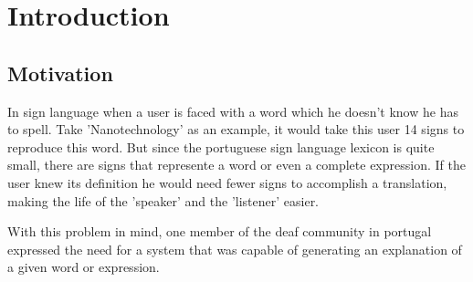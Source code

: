 % 
\chapter{Introduction} %
\label{chap:Chapter1} %

\section{Motivation}

In sign language when a user is faced with a word which he doesn't know he has to spell.
Take 'Nanotechnology' as an example, it would take this user 14 signs to reproduce this word.
But since the portuguese sign language lexicon is quite small, there are signs that represente a word or even a complete expression. 
If the user knew its definition he would need fewer signs to accomplish a translation, making the life of the 'speaker' and the 'listener' easier.

With this problem in mind, one member of the deaf community in portugal expressed the need for a system that was capable of generating an explanation of a given word or expression.